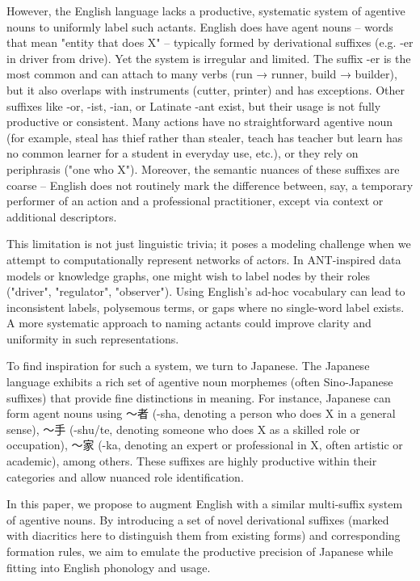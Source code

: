 \documentclass[11pt]{article}
\begin{document}
However, the English language lacks a productive, systematic system of agentive nouns to uniformly label such actants. English does have agent nouns – words that mean "entity that does X" – typically formed by derivational suffixes (e.g. -er in driver from drive). Yet the system is irregular and limited. The suffix -er is the most common and can attach to many verbs (run → runner, build → builder), but it also overlaps with instruments (cutter, printer) and has exceptions. Other suffixes like -or, -ist, -ian, or Latinate -ant exist, but their usage is not fully productive or consistent. Many actions have no straightforward agentive noun (for example, steal has thief rather than stealer, teach has teacher but learn has no common learner for a student in everyday use, etc.), or they rely on periphrasis ("one who X"). Moreover, the semantic nuances of these suffixes are coarse – English does not routinely mark the difference between, say, a temporary performer of an action and a professional practitioner, except via context or additional descriptors.

This limitation is not just linguistic trivia; it poses a modeling challenge when we attempt to computationally represent networks of actors. In ANT-inspired data models or knowledge graphs, one might wish to label nodes by their roles ("driver", "regulator", "observer"). Using English's ad-hoc vocabulary can lead to inconsistent labels, polysemous terms, or gaps where no single-word label exists. A more systematic approach to naming actants could improve clarity and uniformity in such representations.

To find inspiration for such a system, we turn to Japanese. The Japanese language exhibits a rich set of agentive noun morphemes (often Sino-Japanese suffixes) that provide fine distinctions in meaning. For instance, Japanese can form agent nouns using 〜者 (-sha, denoting a person who does X in a general sense), 〜手 (-shu/te, denoting someone who does X as a skilled role or occupation), 〜家 (-ka, denoting an expert or professional in X, often artistic or academic), among others. These suffixes are highly productive within their categories and allow nuanced role identification.

In this paper, we propose to augment English with a similar multi-suffix system of agentive nouns. By introducing a set of novel derivational suffixes (marked with diacritics here to distinguish them from existing forms) and corresponding formation rules, we aim to emulate the productive precision of Japanese while fitting into English phonology and usage.
\end{document}
